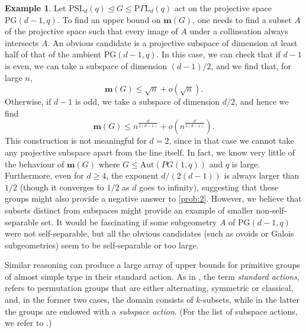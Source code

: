 \documentclass[a4paper]{amsart}
\newcommand{\primozcomment}[1]{\textcolor{magenta}{{\textbf{Primoz:} #1}}}
\newcommand{\Aut}{\mathrm{Aut}}
\newcommand{\m}{\mathbf{m}}
\theoremstyle{definition}
\newtheorem{example}[theorem]{Example}
\begin{document}
\begin{example}
    Let $ \mathrm{PSL}_d(q) \unlhd G \le \mathrm{P}\Gamma \mathrm{L}_d(q)$ act on the projective space $\mathrm{PG}(d-1,q)$. To find an upper bound on $\m(G)$, one needs to find a subset $A$ of the projective space such that every image of $A$ under a collineation always intersects $A$. An obvious candidate is a projective subspace of dimension at least %
    half of that of the ambient $\mathrm{PG}(d-1,q)$. In this case, we can check that if $d-1$ is even, we can take a subspace of dimension $(d-1)/2$, and we find that, for large $n$,
    \[\m(G) \le \sqrt{n}+o(\sqrt{n}).\]
    Otherwise, if $d-1$ is odd, we take a subspace of dimension $d/2$, and hence we find
    \[ \m(G) \le n^{\frac{d}{2(d-1)}} + o \left( n^{\frac{d}{2(d-1)}} \right) .\]
    This construction is not meaningful for $d=2$, since in that case we cannot take any projective subspace apart from the line itself. In fact, we know very little of the behaviour of $\m(G)$ where $G \le \Aut(PG(1,q))$ and $q$ is large. Furthermore, even for $d \ge 4$, the exponent $d/(2(d-1))$ is always larger than $1/2$ (though it converges to $1/2$ as $d$ goes to infinity),  suggesting that these groups might also provide a negative answer to \cref{prob:2}. However, we believe that subsets distinct from subspaces might provide an example of smaller non-self-separable set. It would be fascinating if some subgeometry $A$ of $\mathrm{PG}(d-1,q)$ were not self-separable, but all the obvious candidates (such as ovoids or Galois subgeometries) seem to be self-separable or too large.
\end{example}

Similar reasoning can produce a large array of upper bounds for primitive groups of almost simple type in their standard action. As in \cite{LiebeckShalev2003}, the term \emph{standard actions}, refers to permutation groups that are either alternating, symmetric or classical, and, in the former two cases, the domain consists of $k$-subsets, while in the latter the groups are endowed with a \emph{subspace action}. (For the list of subspace actions, we refer to \cite[Chapter~4]{BurnessGiudici2016}.)
\end{document}
